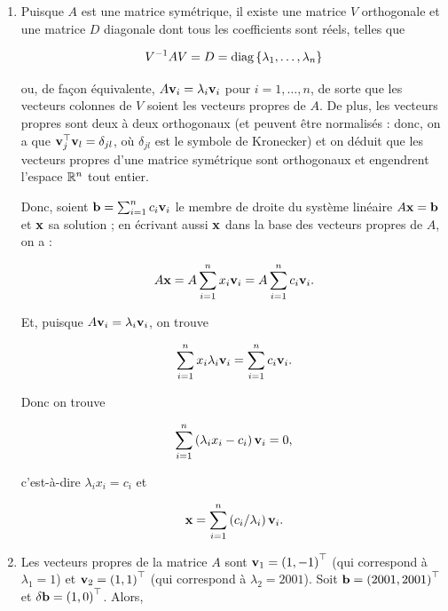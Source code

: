 \begin{enumerate}[label=\alph*)]
  \item Puisque $A$ est une matrice symétrique, il existe une matrice $V$ orthogonale et une matrice $D$ diagonale dont tous les coefficients sont réels, telles que
  
  \begin{equation*}
    V^{-1} A V = D = \text{diag} \left\{\lambda_{1}, \dots, \lambda_{n}\right\}
  \end{equation*}
  
  ou, de façon équivalente, $A \mathbf{v}_{i} = \lambda_{i} \mathbf{v}_{i}$ pour $i = 1, \dots, n$, de sorte que les vecteurs colonnes de $V$ soient les vecteurs propres de $A$.
  De plus, les vecteurs propres sont deux à deux orthogonaux (et peuvent être normalisés : donc, on a que $\mathbf{v}_{j}^{\top} \mathbf{v}_{l} = \delta_{jl}$, où $\delta_{jl}$ est le symbole de Kronecker) et on déduit que les vecteurs propres d'une matrice symétrique sont orthogonaux et engendrent l'espace $\mathbb{R}^{n}$ tout entier.


  Donc, soient $\mathbf{b} = \sum_{i = 1}^{n} c_{i} \mathbf{v}_{i}$ le membre de droite du système linéaire $A \mathbf{x} = \mathbf{b}$ et $\mathbf{x}$ sa solution ; en écrivant aussi $\mathbf{x}$ dans la base des vecteurs propres de $A$, on a :
  
  \begin{equation*}
    A \mathbf{x}
    = A \sum_{i = 1}^{n} x_{i} \mathbf{v}_{i} 
    = A \sum_{i = 1}^{n} c_{i} \mathbf{v}_{i}.
  \end{equation*}
  
  Et, puisque $A \mathbf{v}_{i} = \lambda_{i} \mathbf{v}_{i}$, on trouve
  
  \begin{equation*}
    \sum_{i = 1}^{n} x_{i} \lambda_{i} \mathbf{v}_{i} 
    = \sum_{i = 1}^{n} c_{i} \mathbf{v}_{i}.
  \end{equation*}
  
  Donc on trouve
  
  \begin{equation*}
    \sum_{i = 1}^{n} \left(\lambda_{i} x_{i} - c_{i}\right) \mathbf{v}_{i} 
    = 0,
  \end{equation*}
  
  c'est-à-dire $\lambda_{i} x_{i} = c_{i}$ et
  
  \begin{equation*}
    \mathbf{x} = \sum_{i = 1}^{n} \left(c_{i} / \lambda_{i}\right) \mathbf{v}_{i}.
  \end{equation*}
  
  
  \item Les vecteurs propres de la matrice $A$ sont $\mathbf{v}_{1} = \left(1, -1\right)^{\top}$ (qui correspond à $\lambda_{1} = 1$) et $\mathbf{v}_{2} = \left(1, 1\right)^{\top}$ (qui correspond à $\lambda_{2} = 2001$).
  Soit $\mathbf{b} = \left(2001, 2001\right)^{\top}$ et $\delta \mathbf{b} = \left(1, 0\right)^{\top}$.
  Alors,
  

\end{enumerate}
